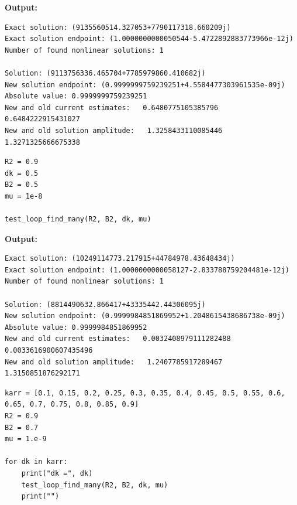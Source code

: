 \documentclass{article}
\begin{document}
\textbf{Output:}\begin{verbatim}
Exact solution: (9135560514.327053+7790117318.660209j)
Exact solution endpoint: (1.0000000000050544-5.4722892883773966e-12j)
Number of found nonlinear solutions: 1

Solution: (9113756336.465704+7785979860.410682j)
New solution endpoint: (0.9999999759239251+4.5584477303961535e-09j) Absolute value: 0.9999999759239251
New and old current estimates:   0.6480775105385796    0.6484222915431027
New and old solution amplitude:   1.3258433110085446    1.3271325666675338

\end{verbatim}

\begin{lstlisting}
R2 = 0.9
dk = 0.5
B2 = 0.5
mu = 1e-8

test_loop_find_many(R2, B2, dk, mu)\end{lstlisting}

\textbf{Output:}\begin{verbatim}
Exact solution: (10249114773.217915+44784978.43648434j)
Exact solution endpoint: (1.0000000000058127-2.833788759204481e-12j)
Number of found nonlinear solutions: 1

Solution: (8814490632.866417+43335442.44306095j)
New solution endpoint: (0.9999984851869952+1.2048615438686738e-09j) Absolute value: 0.9999984851869952
New and old current estimates:   0.0032408979111282488    0.0033616900607435496
New and old solution amplitude:   1.2407785917289467    1.3150851876292171

\end{verbatim}

\begin{lstlisting}
karr = [0.1, 0.15, 0.2, 0.25, 0.3, 0.35, 0.4, 0.45, 0.5, 0.55, 0.6, 0.65, 0.7, 0.75, 0.8, 0.85, 0.9]
R2 = 0.9
B2 = 0.7
mu = 1.e-9

for dk in karr:
    print("dk =", dk)
    test_loop_find_many(R2, B2, dk, mu)
    print("")\end{lstlisting}
\end{document}
